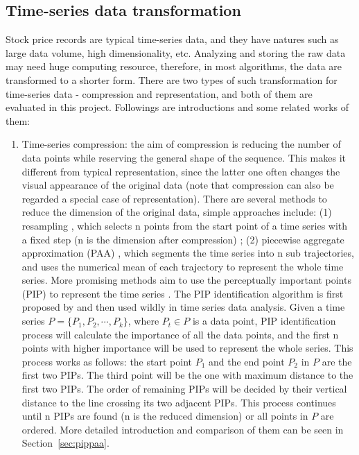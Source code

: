 \subsection{Time-series data transformation}
\label{sec:compression1}
Stock price records are typical time-series data, and they have natures such as large data volume, high dimensionality, etc. Analyzing  and storing the raw data may need huge computing resource, therefore, in most algorithms, the data are transformed to a shorter form. There are two types of such transformation for time-series data - compression and representation, and both of them are evaluated in this project. Followings are introductions and some related works of them:
\begin{enumerate}
    \item Time-series compression: the aim of compression is reducing the number of data points while reserving the general shape of the sequence. This makes it different from typical representation, since the latter one often changes the visual appearance of the original data (note that compression can also be regarded a special case of representation). There are several methods to reduce the dimension of the original data, simple approaches include: (1) resampling \cite{aastrom1969choice}, which selects n points from the start point of a time series with a fixed step (n is the dimension after compression) ; (2) piecewise aggregate approximation (PAA) \cite{keogh2001dimensionality,yi2000fast}, which segments the time series into n sub trajectories, and uses the numerical mean of each trajectory to represent the whole time series. More promising methods aim to use the perceptually important points (PIP) to represent the time series \cite{fu2011review}. The PIP identification algorithm is first proposed by \cite{chung2001flexible} and then used wildly in time series data analysis. Given a time series $ P = \{P_1, P_2, \cdots, P_k\}$, where $P_t \in P$ is a data point, PIP identification process will calculate the importance of all the data points, and the first n points with higher importance will be used to represent the whole series. This process works as follows: the start point $P_1$ and the end point $P_2$ in $P$ are the first two PIPs. The third point will be the one with maximum distance to the first two PIPs. The order of remaining PIPs will be decided by their vertical distance to the line crossing its two adjacent PIPs. This process continues until n PIPs are found (n is the reduced dimension) or all points in $P$ are ordered. More detailed introduction and comparison of them can be seen in Section~\ref{sec:pippaa}.

\end{enumerate}
